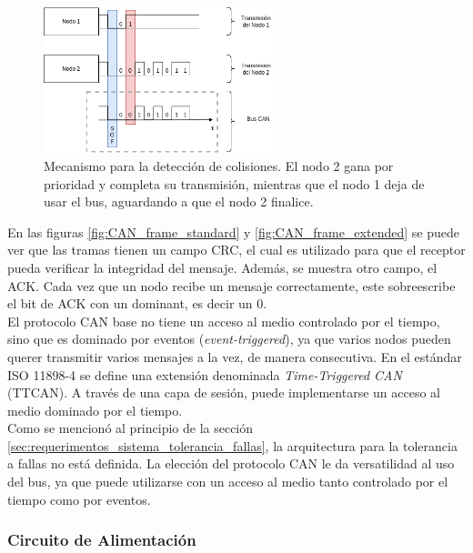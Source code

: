 \begin{figure}[H]
    \centering
    \includegraphics[width=0.6\textwidth]{img/CAN_arbitration.png}
    \caption{Mecanismo para la detección de colisiones. El nodo 2 gana por prioridad y completa su transmisión, mientras que el nodo 1 deja de usar el bus, aguardando a que el nodo 2 finalice.}
    \label{fig:CAN_arbitration}
\end{figure}

En las figuras \ref{fig:CAN_frame_standard} y \ref{fig:CAN_frame_extended} se puede ver que las tramas tienen un campo CRC, el cual es utilizado para que el receptor pueda verificar la integridad del mensaje. Además, se muestra otro campo, el ACK. Cada vez que un nodo recibe un mensaje correctamente, este sobreescribe el bit de ACK con un dominant, es decir un 0.\\

El protocolo CAN base no tiene un acceso al medio controlado por el tiempo, sino que es dominado por eventos (\textit{event-triggered}), ya que varios nodos pueden querer transmitir varios mensajes a la vez, de manera consecutiva. En el estándar ISO 11898-4\cite{ISO11898_4} se define una extensión denominada \textit{Time-Triggered CAN} (TTCAN). A través de una capa de sesión, puede implementarse un acceso al medio dominado por el tiempo.\\

Como se mencionó al principio de la sección \ref{sec:requerimentos_sistema_tolerancia_fallas}, la arquitectura para la tolerancia a fallas no está definida. La elección del protocolo CAN le da versatilidad al uso del bus, ya que puede utilizarse con un acceso al medio tanto controlado por el tiempo como por eventos.

\subsubsection{Circuito de Alimentación}

